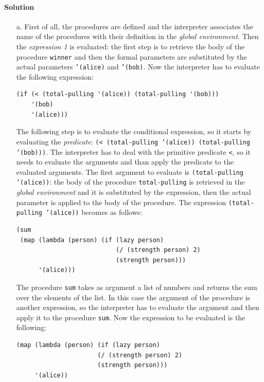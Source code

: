 \paragraph{Solution}
\begin{itemize}
    \item[a.] First of all, the procedures are defined and the interpreter associates the name of the procedures with their definition
        in the \textit{global environment}.
        Then the \textit{expression 1} is evaluated: the first step is to retrieve the body of the procedure \texttt{winner} and
        then the formal parameters are substituted by the actual parameters \texttt{'(alice)} and \texttt{'(bob)}. Now the interpreter
        has to evaluate the following expression:
        \begin{lstlisting}
(if (< (total-pulling '(alice)) (total-pulling '(bob)))
    '(bob)
    '(alice)))  
        \end{lstlisting}
        The following step is to evaluate the conditional expression, so it starts by evaluating the \textit{predicate}: 
        \texttt{(< (total-pulling '(alice)) (total-pulling '(bob)))}. The interpreter has to deal with the primitive predicate
        \texttt{<}, so it needs to evaluate the arguments and than apply the predicate to the evaluated arguments.
        The first argument to evaluate is \texttt{(total-pulling '(alice))}: the body of the procedure \texttt{total-pulling} 
        is retrieved in the \textit{global environment} and it is substituted by the expression, 
        then the actual parameter is applied to the body of the procedure. The expression \texttt{(total-pulling '(alice))} becomes
        as follows:
        \begin{lstlisting}
(sum
 (map (lambda (person) (if (lazy person)
                           (/ (strength person) 2)
                           (strength person)))
      '(alice)))
        \end{lstlisting}
        The procedure \texttt{sum} takes as argument a list of numbers and returns the sum over the elements of the list. In this case
        the argument of the procedure is another expression, so the interpreter has to evaluate the argument and then apply it to the
        procedure \texttt{sum}.
        Now the expression to be evaluated is the following:
        \begin{lstlisting}
(map (lambda (person) (if (lazy person)
                      (/ (strength person) 2)
                      (strength person)))
     '(alice))
        \end{lstlisting}

\end{itemize}
